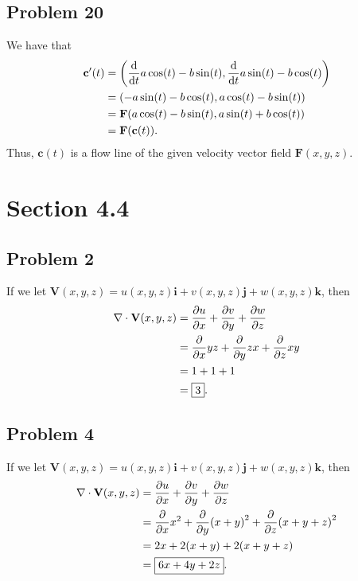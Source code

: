 \documentclass[11pt]{article}
\renewcommand{\vec}[1]{\mathbf{#1}}
\renewcommand{\grad}{\nabla}
\begin{document}

\subsection*{Problem 20}

We have that
\begin{align*}
	\vec{c}'(t) &= \left( \dv{t} a \cos(t) - b \sin(t), \dv{t} a \sin(t) - b \cos(t) \right) \\
	&= \left( -a \sin(t) - b \cos(t), a \cos(t) - b \sin(t) \right) \\
	&= \mathbf{F}(a \cos(t) - b \sin(t), a \sin(t) + b \cos(t)) \\
	&= \mathbf{F}(\vec{c}(t)).
\end{align*}
Thus, $\vec{c}(t)$ is a flow line of the given velocity vector field $\mathbf{F}(x, y, z)$.


\section{Section 4.4}


\subsection*{Problem 2}

If we let $\vec{V}(x, y, z) = u(x, y, z) \vec{i} + v(x, y, z) \vec{j} + w(x, y, z) \vec{k}$, then 
\begin{align*}
	\grad \cdot \vec{V}(x, y, z) &= \pdv{u}{x} + \pdv{v}{y} + \pdv{w}{z} \\
	&= \pdv{x} yz + \pdv{y} zx + \pdv{z} xy \\
	&= 1 + 1 + 1 \\
	&= \boxed{3}.
\end{align*}


\subsection*{Problem 4}

If we let $\vec{V}(x, y, z) = u(x, y, z) \vec{i} + v(x, y, z) \vec{j} + w(x, y, z) \vec{k}$, then 
\begin{align*}
	\grad \cdot \vec{V}(x, y, z) &= \pdv{u}{x} + \pdv{v}{y} + \pdv{w}{z} \\
	&= \pdv{x} x^{2} + \pdv{y} (x + y)^{2} + \pdv{z} (x + y + z)^{2} \\
	&= 2x + 2(x + y) + 2(x + y + z) \\
	&= \boxed{6x + 4y + 2z}.
\end{align*}
\end{document}
